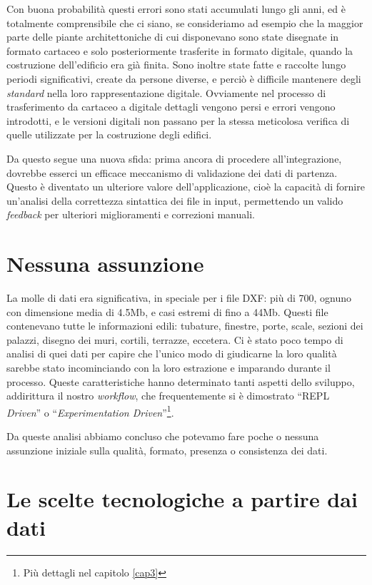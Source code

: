 \documentclass[12pt]{report}
\begin{document}
Con buona probabilità questi errori sono stati accumulati lungo gli anni, ed è totalmente comprensibile che ci siano, se  consideriamo ad esempio che la maggior parte delle piante architettoniche di cui disponevano sono state disegnate in formato cartaceo e solo posteriormente trasferite in formato digitale, quando la costruzione dell'edificio era già finita. Sono inoltre state fatte e raccolte lungo periodi significativi, create da persone diverse, e perciò è difficile mantenere degli \textit{standard} nella loro rappresentazione digitale. Ovviamente nel processo di trasferimento da cartaceo a digitale dettagli vengono persi e errori vengono introdotti, e le versioni digitali non passano per la stessa meticolosa verifica di quelle utilizzate per la costruzione degli edifici. 

Da questo segue una nuova sfida: prima ancora di procedere all'integrazione, dovrebbe esserci un efficace meccanismo di validazione dei dati di partenza. Questo è diventato un ulteriore valore dell'applicazione, cioè la capacità di fornire un'analisi della correttezza sintattica dei file in input, permettendo un valido \textit{feedback} per ulteriori miglioramenti e correzioni manuali.

\section*{Nessuna assunzione}

La molle di dati era significativa, in speciale per i file DXF: più di 700, ognuno con dimensione media di 4.5Mb, e casi estremi di fino a 44Mb. Questi file contenevano tutte le informazioni edili: tubature, finestre, porte, scale, sezioni dei palazzi, disegno dei muri, cortili, terrazze, eccetera. Ci è stato poco tempo di analisi di quei dati per capire che l'unico modo di giudicarne la loro qualità sarebbe stato incominciando con la loro estrazione e imparando durante il processo. Queste caratteristiche hanno determinato tanti aspetti dello sviluppo, addirittura il nostro \textit{workflow}, che frequentemente si è dimostrato ``REPL \textit{Driven}'' o ``\textit{Experimentation Driven}''\footnote{Più dettagli nel capitolo \ref{cap3}}. 

Da queste analisi abbiamo concluso che potevamo fare poche o nessuna assunzione iniziale sulla qualità, formato, presenza o consistenza dei dati.

\section{Le scelte tecnologiche a partire dai dati}
\end{document}
